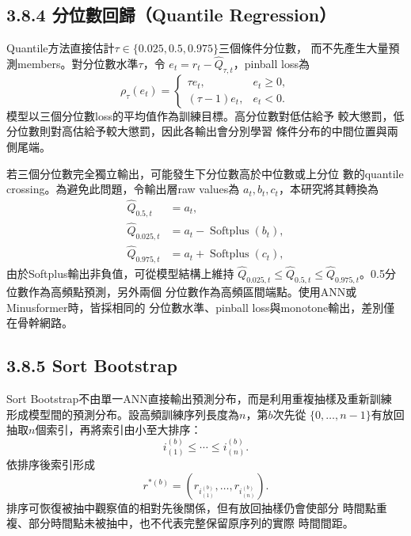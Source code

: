 \subsection*{3.8.4 分位數回歸（Quantile Regression）}

Quantile方法直接估計$\tau\in\{0.025,0.5,0.975\}$三個條件分位數，
而不先產生大量預測members。對分位數水準$\tau$，令
$e_t=r_t-\widehat Q_{\tau,t}$，pinball loss為
\begin{equation}
 \rho_\tau(e_t)=
 \begin{cases}
  \tau e_t, & e_t\geq0,\\
  (\tau-1)e_t, & e_t<0.
 \end{cases}
\end{equation}
模型以三個分位數loss的平均值作為訓練目標。高分位數對低估給予
較大懲罰，低分位數則對高估給予較大懲罰，因此各輸出會分別學習
條件分布的中間位置與兩側尾端。

若三個分位數完全獨立輸出，可能發生下分位數高於中位數或上分位
數的quantile crossing。為避免此問題，令輸出層raw values為
$a_t,b_t,c_t$，本研究將其轉換為
\begin{align}
 \widehat Q_{0.5,t}&=a_t,\\
 \widehat Q_{0.025,t}&=a_t-\operatorname{Softplus}(b_t),\\
 \widehat Q_{0.975,t}&=a_t+\operatorname{Softplus}(c_t),
\end{align}
由於Softplus輸出非負值，可從模型結構上維持
$\widehat Q_{0.025,t}\leq\widehat Q_{0.5,t}
\leq\widehat Q_{0.975,t}$。0.5分位數作為高頻點預測，另外兩個
分位數作為高頻區間端點。使用ANN或Minusformer時，皆採相同的
分位數水準、pinball loss與monotone輸出，差別僅在骨幹網路。

\subsection*{3.8.5 Sort Bootstrap}

Sort Bootstrap不由單一ANN直接輸出預測分布，而是利用重複抽樣及重新訓練
形成模型間的預測分布。設高頻訓練序列長度為$n$，第$b$次先從
$\{0,\ldots,n-1\}$有放回抽取$n$個索引，再將索引由小至大排序：
\begin{equation}
 i_{(1)}^{(b)}\leq\cdots\leq i_{(n)}^{(b)}.
\end{equation}
依排序後索引形成
\begin{equation}
 r^{*(b)}=\left(r_{i_{(1)}^{(b)}},\ldots,
 r_{i_{(n)}^{(b)}}\right).
\end{equation}
排序可恢復被抽中觀察值的相對先後關係，但有放回抽樣仍會使部分
時間點重複、部分時間點未被抽中，也不代表完整保留原序列的實際
時間間距。

